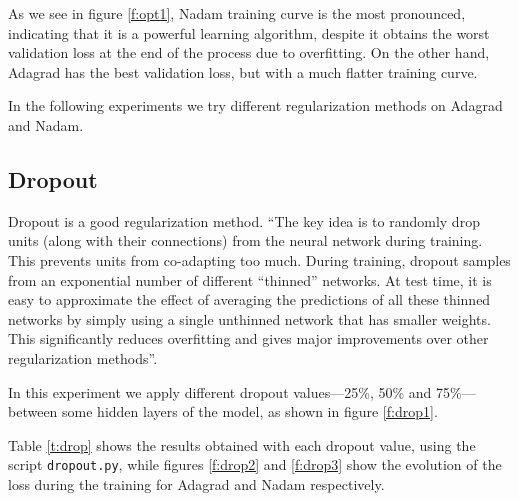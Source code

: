 \documentclass[]{article}
\begin{document}
As we see in figure \ref{f:opt1}, Nadam training curve is the most pronounced, indicating that it is a powerful learning algorithm, despite it obtains the worst validation loss at the end of the process due to overfitting. On the other hand, Adagrad has the best validation loss, but with a much flatter training curve.

In the following experiments we try different regularization methods on Adagrad and Nadam.

\subsection{Dropout}

Dropout is a good regularization method. \cite{srivastava2014dropout} ``The key idea is to randomly drop units (along with their connections) from the neural network during training. This prevents units from co-adapting too much. During training, dropout samples from an exponential number of different ``thinned'' networks. At test time, it is easy to approximate the effect of averaging the predictions of all these thinned networks by simply using a single unthinned network that has smaller weights. This significantly reduces overfitting and gives major improvements over other regularization methods''.

In this experiment we apply different dropout values---25\%, 50\% and 75\%---between some hidden layers of the model, as shown in figure \ref{f:drop1}.

Table \ref{t:drop} shows the results obtained with each dropout value, using the script \texttt{dropout.py}, while figures \ref{f:drop2} and \ref{f:drop3} show the evolution of the loss during the training for Adagrad and Nadam respectively.
\end{document}
